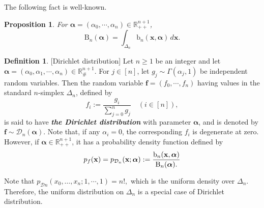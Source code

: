 \documentclass[12pt, a4paper]{amsart}
\theoremstyle{plain}
\newtheorem{prop}[thm]{Proposition}
\theoremstyle{definition}
\newtheorem{defn}[thm]{Definition}
\numberwithin{figure}{section}
\numberwithin{table}{section}
\newcommand{\newword}[1]{\textbf{\textit{#1}}}
\numberwithin{equation}{section}
\begin{document}
The following fact is well-known.

\begin{prop}%
\label{prop:multiBetaFun}
For
$
	\boldsymbol{\alpha}
=
	(\alpha_0, \cdots, \alpha_n)
\in
	\mathbb{R}_{++}^{n+1}
$,
\begin{equation}
\label{eq:multiBetaFunTwo}
\mathrm{B}_n(
	\boldsymbol{\alpha}
)
		=
\int_{\Delta_n}
	\mathrm{b}_n(
		\mathbf{x},
		\boldsymbol{\alpha}
	)
\, d \mathbf{x}.
\end{equation}
\end{prop}



\begin{defn}{[Dirichlet distribution]}
\label{defn:dirichDist}
Let 
$n \ge 1$
be an integer
and
let
$
\boldsymbol{\alpha}
	=
(\alpha_0, \alpha_1, \cdots, \alpha_n) 
	\in
\mathbb{R}_{\#}^{n+1}
$.
%
For
$j \in [n]$,
let
$
g_j
	\sim
\Gamma(\alpha_j, 1)
$
be independent random variables.
Then the random variable
$
\mathbf{f}
	=
(f_0, \cdots, f_n)
$
having values in
the standard $n$-simplex
$\Delta_n$,
defined by
\begin{equation}
\label{eq:dirichletRN}
f_i
	:=
\frac{g_i}{\sum_{j=0}^n g_j}
	\quad
(i \in [n]),
\end{equation}
is said to have \newword{the Dirichlet distribution} with parameter
$
\boldsymbol{\alpha}
$,
and is denoted by
$
\mathbf{f}
	\sim
\mathcal{D}_n(
		\boldsymbol{\alpha}
) .
$
Note that, if any
$\alpha_i = 0$,
the corresponding 
$f_i$
is degenerate at zero.
However, 
if
$
\boldsymbol{\alpha} \in \mathbb{R}_{++}^{n+1}
$,
it has a probability density function defined by
\begin{equation}
\label{eq:pnDirichret}
p_f(\mathbf{x})
	=
p_{\mathcal{D}_n}(\mathbf{x}; \boldsymbol{\alpha})
	:=
\frac{
	\mathrm{b}_n(
		\mathbf{x}, 
		\boldsymbol{\alpha}
	)
}{
	\mathrm{B}_n(
		\boldsymbol{\alpha}
	) .
}
\end{equation}
%


\end{defn}


Note that
$
p_{\mathcal{D}n}(x_0, \dots, x_n; 1, \cdots, 1) = n! ,
$
which is the uniform density over
$
\Delta_n
$.
Therefore,
the uniform distribution on $\Delta_n$ is a special case of Dirichlet distribution.
\end{document}
